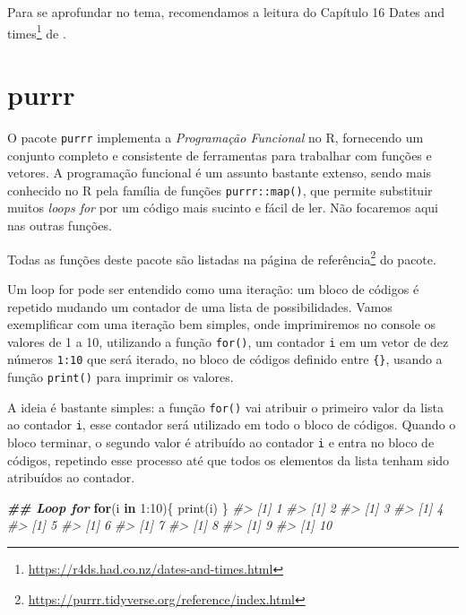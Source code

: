 \documentclass[
]{book}
\newenvironment{Shaded}{\begin{snugshade}}{\end{snugshade}}
\newcommand{\CommentTok}[1]{\textcolor[rgb]{0.37,0.37,0.37}{\textit{#1}}}
\newcommand{\ControlFlowTok}[1]{\textcolor[rgb]{0.27,0.27,0.27}{\textbf{#1}}}
\newcommand{\DecValTok}[1]{\textcolor[rgb]{0.06,0.06,0.06}{#1}}
\newcommand{\DocumentationTok}[1]{\textcolor[rgb]{0.37,0.37,0.37}{\textbf{\textit{#1}}}}
\newcommand{\FunctionTok}[1]{\textcolor[rgb]{0,0,0}{#1}}
\newcommand{\NormalTok}[1]{#1}
\newcommand{\SpecialCharTok}[1]{\textcolor[rgb]{0,0,0}{#1}}
\renewcommand{\href}[2]{#2\footnote{\url{#1}}}
\begin{document}
Para se aprofundar no tema, recomendamos a leitura do Capítulo \href{https://r4ds.had.co.nz/dates-and-times.html}{16 Dates and times} de \citet{wickham2017}.

\hypertarget{purrr}{%
\section{purrr}\label{purrr}}

O pacote \texttt{purrr} implementa a \emph{Programação Funcional} no R, fornecendo um conjunto completo e consistente de ferramentas para trabalhar com funções e vetores. A programação funcional é um assunto bastante extenso, sendo mais conhecido no R pela família de funções \texttt{purrr::map()}, que permite substituir muitos \emph{loops for} por um código mais sucinto e fácil de ler. Não focaremos aqui nas outras funções.

Todas as funções deste pacote são listadas na \href{https://purrr.tidyverse.org/reference/index.html}{página de referência} do pacote.

Um loop for pode ser entendido como uma iteração: um bloco de códigos é repetido mudando um contador de uma lista de possibilidades. Vamos exemplificar com uma iteração bem simples, onde imprimiremos no console os valores de 1 a 10, utilizando a função \texttt{for()}, um contador \texttt{i} em um vetor de dez números \texttt{1:10} que será iterado, no bloco de códigos definido entre \texttt{\{\}}, usando a função \texttt{print()} para imprimir os valores.

A ideia é bastante simples: a função \texttt{for()} vai atribuir o primeiro valor da lista ao contador \texttt{i}, esse contador será utilizado em todo o bloco de códigos. Quando o bloco terminar, o segundo valor é atribuído ao contador \texttt{i} e entra no bloco de códigos, repetindo esse processo até que todos os elementos da lista tenham sido atribuídos ao contador.

\begin{Shaded}
\begin{Highlighting}[]
\DocumentationTok{\#\# Loop for}
\ControlFlowTok{for}\NormalTok{(i }\ControlFlowTok{in} \DecValTok{1}\SpecialCharTok{:}\DecValTok{10}\NormalTok{)\{}
  \FunctionTok{print}\NormalTok{(i)}
\NormalTok{\}}
\CommentTok{\#\textgreater{} [1] 1}
\CommentTok{\#\textgreater{} [1] 2}
\CommentTok{\#\textgreater{} [1] 3}
\CommentTok{\#\textgreater{} [1] 4}
\CommentTok{\#\textgreater{} [1] 5}
\CommentTok{\#\textgreater{} [1] 6}
\CommentTok{\#\textgreater{} [1] 7}
\CommentTok{\#\textgreater{} [1] 8}
\CommentTok{\#\textgreater{} [1] 9}
\CommentTok{\#\textgreater{} [1] 10}
\end{Highlighting}
\end{Shaded}
\end{document}
